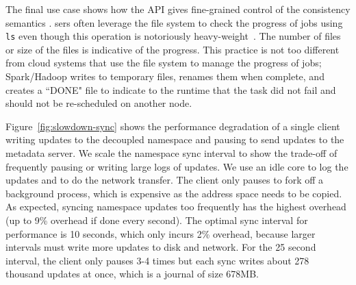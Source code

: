 The final use case shows how the API gives
 fine-grained control of the
consistency semantics . sers often
leverage the file system to check the progress of jobs using \texttt{ls} even
though this operation is notoriously heavy-weight~\cite{carns:ipdps09-pvfs,
eshel:fast10-panache}. The number of files or size of the files is indicative
of the progress. This practice is not too different from cloud systems that use the
file system to manage the progress of jobs; Spark/Hadoop writes to temporary
files, renames them when complete, and creates a ``DONE" file to indicate to
the runtime that the task did not fail and should not be re-scheduled on
another node.  


Figure~\ref{fig:slowdown-sync} shows the performance degradation of a single
client writing  updates to the decoupled namespace and
pausing to send updates to the metadata server.  We scale the namespace sync interval to
show the trade-off of frequently pausing or writing large logs of updates.  We
use an idle core to log the updates and to do the network transfer. The client
only pauses to fork off a background process, which is expensive as the address
space needs to be copied.  As expected, syncing namespace updates too
frequently has the highest overhead (up to 9\% overhead if done every second).
The optimal sync interval for performance is 10 seconds, which only incurs 2\%
overhead, because larger intervals must write more updates to disk and network.
For the 25 second interval, the client only pauses 3-4 times but each sync
writes about 278 thousand updates at once, which is a journal of size 678MB.

